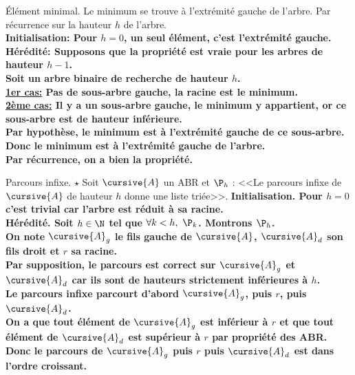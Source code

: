 \documentclass[french, 11pt]{article}
\begin{document}
\vspace*{-0.7cm}

\begin{prop}{Élément minimal.}{}
    Le minimum se trouve à l'extrémité gauche de l'arbre.
    \tcblower
    Par récurrence sur la hauteur $h$ de l'arbre.\\
    \bf{Initialisation:} Pour $h=0$, un seul élément, c'est l'extrémité gauche.\\
    \bf{Hérédité:} Supposons que la propriété est vraie pour les arbres de hauteur $h-1$.\\
    Soit un arbre binaire de recherche de hauteur $h$.\\
    \underline{1er cas:} Pas de sous-arbre gauche, la racine est le minimum.\\
    \underline{2ème cas:} Il y a un sous-arbre gauche, le minimum y appartient, or ce sous-arbre est de hauteur inférieure.\\
    Par hypothèse, le minimum est à l'extrémité gauche de ce sous-arbre.\\
    Donc le minimum est à l'extrémité gauche de l'arbre.\\
    Par récurrence, on a bien la propriété.
\end{prop}

\begin{prop}{Parcours infixe. $\star$}{}
    Soit $\cursive{A}$ un ABR et $\P_h$ : <<Le parcours infixe de $\cursive{A}$ de hauteur $h$ donne une liste triée>>.
    \tcblower
    \bf{Initialisation.} Pour $h=0$ c'est trivial car l'arbre est réduit à sa racine.\\
    \bf{Hérédité.} Soit $h\in\N$ tel que $\forall k < h, ~ \P_k$. Montrons $\P_h$.\\
    On note $\cursive{A}_g$ le fils gauche de $\cursive{A}$, $\cursive{A}_d$ son fils droit et $r$ sa racine.\\
    Par supposition, le parcours est correct sur $\cursive{A}_g$ et $\cursive{A}_d$ car ils sont de hauteurs strictement inférieures à $h$.\\
    Le parcours infixe parcourt d'abord $\cursive{A}_g$, puis $r$, puis $\cursive{A}_d$.\\
    On a que tout élément de $\cursive{A}_g$ est inférieur à $r$ et que tout élément de $\cursive{A}_d$ est supérieur à $r$ par propriété des ABR.\\
    Donc le parcours de $\cursive{A}_g$ puis $r$ puis $\cursive{A}_d$ est dans l'ordre croissant.
\end{prop}
\end{document}
